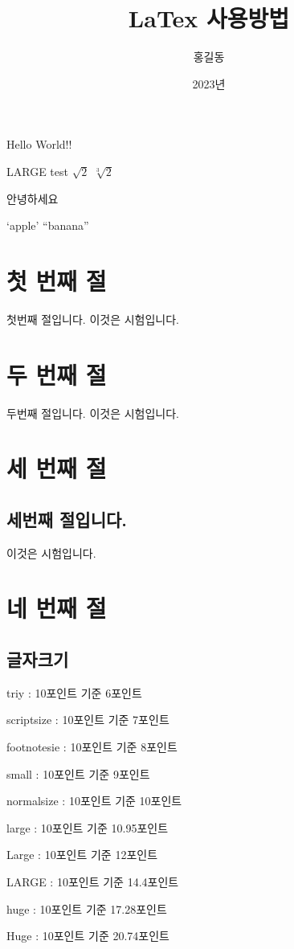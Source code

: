 \documentclass{oblivoir}
\title{LaTex 사용방법}
\author{홍길동}
\date{2023년}
\begin{document}
\maketitle
Hello World!!
\begin{center}
\LARGE LARGE test
$\sqrt{2}$
$\sqrt[3]{2}$

안녕하세요

`apple'
``banana''


\section[목차에 표시되는 내용입니다.]{첫 번째 절}
첫번째 절입니다.
이것은 시험입니다.

\section*{두 번째 절}
두번째 절입니다.
이것은 시험입니다.

\section{세 번째 절}
\subsection{세번째 절입니다.}
이것은 시험입니다.

\section{네 번째 절}
\subsection{글자크기}
{\tiny triy : 10포인트} 기준 6포인트

\scriptsize scriptsize : 10포인트 기준 7포인트

\footnotesize footnotesie : 10포인트 기준 8포인트

\small small : 10포인트 기준 9포인트

\normalsize normalsize : 10포인트 기준 10포인트

\large large : 10포인트 기준 10.95포인트

\Large Large : 10포인트 기준 12포인트

\LARGE LARGE : 10포인트 기준 14.4포인트

\huge huge : 10포인트 기준 17.28포인트

\Huge Huge : 10포인트 기준 20.74포인트



\end{center}
\end{document}
